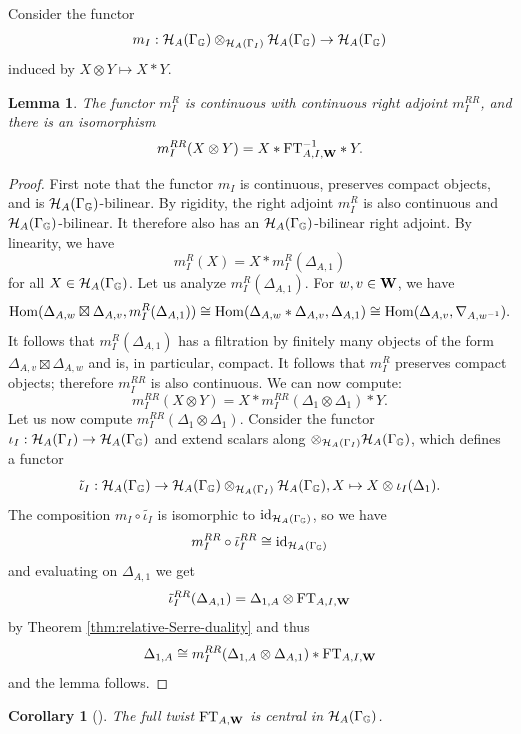 \documentclass[a4paper, 10pt, oneside, reqno]{amsart}
\theoremstyle{plain}
\newtheorem{lem}[thm]{Lemma}
\newtheorem{corol}[thm]{Corollary}
\theoremstyle{definition}
\theoremstyle{remark}
\newcommand{\Gbb}{\mathbb{G}}
\newcommand{\FT}{\mathrm{FT}}
\begin{document}
Consider the functor 
$$m_I : \Hcal_A(\Gamma_{\Gbb}) \otimes_{\Hcal_{A}(\Gamma_{I})}  \Hcal_A(\Gamma_{\Gbb}) \to  \Hcal_A(\Gamma_{\Gbb})$$
induced by $X \otimes Y \mapsto X * Y$. 

\begin{lem}\label{lem:relative-serre-duality-for-multiplication}
The functor $m_I^R$ is continuous with continuous right adjoint $m_I^{RR}$, and there is an isomorphism 
$$m_I^{RR}(X \otimes Y) = X * \FT_{A,I, \Wbf}^{-1} * Y.$$
\end{lem}

\begin{proof}
First note that the functor $m_I$ is continuous, preserves compact objects, and is $\Hcal_A(\Gamma_{\Gbb})$-bilinear. By rigidity, the right adjoint $m_I^R$ is also continuous and $\Hcal_A(\Gamma_{\Gbb})$-bilinear. It therefore also has an $\Hcal_A(\Gamma_{\Gbb})$-bilinear right adjoint. By linearity, we have 
$$m_I^R(X) = X * m_I^R(\Delta_{A,1})$$
for all $X \in \Hcal_A(\Gamma_{\Gbb})$. Let us analyze $m_I^R(\Delta_{A,1})$. For $w,v \in \mathbf{W}$, we have 
$$
\mathrm{Hom}(\Delta_{A,w} \boxtimes \Delta_{A,v}, m_I^R(\Delta_{A,1})) \cong \mathrm{Hom}(\Delta_{A,w} * \Delta_{A,v}, \Delta_{A,1}) \cong \mathrm{Hom}(\Delta_{A,v}, \nabla_{A,w^{-1}}).
$$
It follows that $m_I^R(\Delta_{A,1})$ has a filtration by finitely many objects of the form $\Delta_{A,v} \boxtimes \Delta_{A,w}$ and is, in particular, compact. It follows that $m_I^R$ preserves compact objects; therefore $m_I^{RR}$ is also continuous. We can now compute: 
$$m_I^{RR}(X \otimes Y) = X * m_I^{RR}(\Delta_1 \otimes \Delta_1) * Y.$$
Let us now compute $m_{I}^{RR}(\Delta_1 \otimes \Delta_1)$. Consider the functor $\iota_I : \Hcal_A(\Gamma_I) \to \Hcal_A(\Gamma_{\Gbb})$ and extend scalars along $\otimes_{\Hcal_{A}(\Gamma_I)} \Hcal_{A}(\Gamma_{\Gbb})$, which defines a functor
$$\tilde{\iota}_I : \Hcal_A(\Gamma_{\Gbb}) \to \Hcal_A(\Gamma_{\Gbb}) \otimes_{\Hcal_{A}(\Gamma_{I})}  \Hcal_A(\Gamma_{\Gbb}), X \mapsto X \otimes \iota_I(\Delta_1).$$
The composition $m_I \circ \tilde{\iota_I}$ is isomorphic to $\id_{\Hcal_A(\Gamma_{\Gbb})}$, so we have 
$$m_I^{RR} \circ \tilde{\iota}_I^{RR} \cong \id_{\Hcal_A(\Gamma_{\Gbb})}$$
and evaluating on $\Delta_{A,1}$ we get 
$$\tilde{\iota}_I^{RR}(\Delta_{A,1}) = \Delta_{1,A} \otimes \FT_{A,I,\Wbf}$$ 
by Theorem \ref{thm:relative-Serre-duality} and thus 
$$\Delta_{1,A} \cong m_I^{RR}(\Delta_{1,A} \otimes \Delta_{A,1}) *  \FT_{A,I,\Wbf}$$
and the lemma follows. 
\end{proof}

\begin{corol}[]\label{corol:centrality-full-twist}
The full twist $\FT_{A, \Wbf}$ is central in $\Hcal_{A}(\Gamma_{\Gbb})$.
\end{corol}
\end{document}
